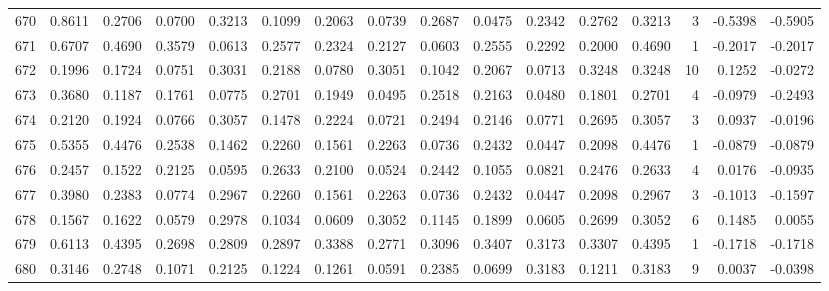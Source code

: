 \begin{tabular}{lrrrrrrrrrrrrrrr}
670 &      0.8611 &  0.2706 &  0.0700 &  0.3213 &  0.1099 &  0.2063 &  0.0739 &  0.2687 &  0.0475 &  0.2342 &   0.2762 &     0.3213 &      3 &                   -0.5398 &                    -0.5905 \\
671 &      0.6707 &  0.4690 &  0.3579 &  0.0613 &  0.2577 &  0.2324 &  0.2127 &  0.0603 &  0.2555 &  0.2292 &   0.2000 &     0.4690 &      1 &                   -0.2017 &                    -0.2017 \\
672 &      0.1996 &  0.1724 &  0.0751 &  0.3031 &  0.2188 &  0.0780 &  0.3051 &  0.1042 &  0.2067 &  0.0713 &   0.3248 &     0.3248 &     10 &                    0.1252 &                    -0.0272 \\
673 &      0.3680 &  0.1187 &  0.1761 &  0.0775 &  0.2701 &  0.1949 &  0.0495 &  0.2518 &  0.2163 &  0.0480 &   0.1801 &     0.2701 &      4 &                   -0.0979 &                    -0.2493 \\
674 &      0.2120 &  0.1924 &  0.0766 &  0.3057 &  0.1478 &  0.2224 &  0.0721 &  0.2494 &  0.2146 &  0.0771 &   0.2695 &     0.3057 &      3 &                    0.0937 &                    -0.0196 \\
675 &      0.5355 &  0.4476 &  0.2538 &  0.1462 &  0.2260 &  0.1561 &  0.2263 &  0.0736 &  0.2432 &  0.0447 &   0.2098 &     0.4476 &      1 &                   -0.0879 &                    -0.0879 \\
676 &      0.2457 &  0.1522 &  0.2125 &  0.0595 &  0.2633 &  0.2100 &  0.0524 &  0.2442 &  0.1055 &  0.0821 &   0.2476 &     0.2633 &      4 &                    0.0176 &                    -0.0935 \\
677 &      0.3980 &  0.2383 &  0.0774 &  0.2967 &  0.2260 &  0.1561 &  0.2263 &  0.0736 &  0.2432 &  0.0447 &   0.2098 &     0.2967 &      3 &                   -0.1013 &                    -0.1597 \\
678 &      0.1567 &  0.1622 &  0.0579 &  0.2978 &  0.1034 &  0.0609 &  0.3052 &  0.1145 &  0.1899 &  0.0605 &   0.2699 &     0.3052 &      6 &                    0.1485 &                     0.0055 \\
679 &      0.6113 &  0.4395 &  0.2698 &  0.2809 &  0.2897 &  0.3388 &  0.2771 &  0.3096 &  0.3407 &  0.3173 &   0.3307 &     0.4395 &      1 &                   -0.1718 &                    -0.1718 \\
680 &      0.3146 &  0.2748 &  0.1071 &  0.2125 &  0.1224 &  0.1261 &  0.0591 &  0.2385 &  0.0699 &  0.3183 &   0.1211 &     0.3183 &      9 &                    0.0037 &                    -0.0398 \\

\end{tabular}
